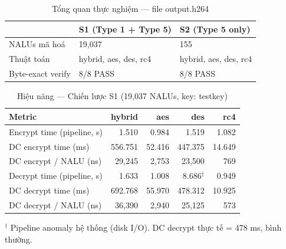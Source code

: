 
\begin{table}[ht]
\centering
\caption{Tổng quan thực nghiệm — file output.h264}
\label{tab:overview}
\begin{tabular}{lll}
\toprule
 & S1 (Type 1 + Type 5) & S2 (Type 5 only) \\
\midrule
NALUs mã hoá       & 19{,}037 & 155 \\
Thuật toán         & hybrid, aes, des, rc4 & hybrid, aes, des, rc4 \\
Byte-exact verify  & 8/8 PASS & 8/8 PASS \\
\bottomrule
\end{tabular}
\end{table}

\begin{table}[ht]
\centering
\caption{Hiệu năng — Chiến lược S1 (19{,}037 NALUs, key: testkey)}
\label{tab:perf_s1}
\begin{tabular}{lrrrr}
\toprule
Metric & hybrid & aes & des & rc4 \\
\midrule
Encrypt time (pipeline, s)  & 1.510 & 0.984 & 1.519 & 1.082 \\
DC encrypt time (ms)        & 556.751 & 52.416 & 447.375 & 14.649 \\
DC encrypt / NALU (ns)      & 29{,}245 & 2{,}753 & 23{,}500 & 769 \\
Decrypt time (pipeline, s)  & 1.633 & 1.008 & 8.686$^\dagger$ & 0.949 \\
DC decrypt time (ms)        & 692.768 & 55.970 & 478.312 & 10.925 \\
DC decrypt / NALU (ns)      & 36{,}390 & 2{,}940 & 25{,}125 & 573 \\
\bottomrule
\end{tabular}
\begin{tablenotes}
\small
\item $^\dagger$ Pipeline anomaly hệ thống (disk I/O). DC decrypt thực tế = 478 ms, bình thường.
\end{tablenotes}
\end{table}

